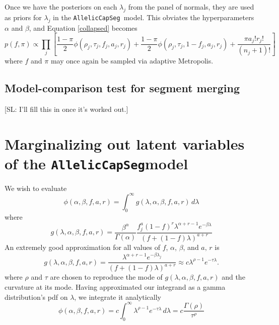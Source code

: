 \documentclass[nofootinbib,amssymb,amsmath]{revtex4}
\newcommand{\ACS}{\texttt{AllelicCapSeg}}
\def\SL#1{{\color [rgb]{0,0,0.8} [SL: #1]}}
\begin{document}
Once we have the posteriors on each $\lambda_j$ from the panel of normals, they are used as priors for $\lambda_j$ in the \ACS~model.  This obviates the hyperparameters $\alpha$ and $\beta$, and Equation \ref{collapsed} becomes
%
\begin{equation}
p(f, \pi) \propto \prod_j 
\left[    \frac{1-\pi}{2} \phi(\rho_j, \tau_j, f_j, a_j, r_j)  +
\frac{1-\pi}{2} \phi(\rho_j, \tau_j, 1 - f_j, a_j, r_j)  +
 \frac{ \pi a_j! r_j!}{(n_j + 1)!}    \right]
 \label{collapsed_using_pon}
\end{equation}
%
where $f$ and $\pi$ may once again be sampled via adaptive Metropolis.

\subsection{Model-comparison test for segment merging} \label{likelihood-based-segment-merging}

\SL{I'll fill this in once it's worked out.}

\appendix

\section{Marginalizing out latent variables of the \ACS model} \label{marginalizing}
We wish to evaluate
%
\begin{equation}
\phi(\alpha, \beta, f, a, r) = \int_0^\infty g(\lambda, \alpha, \beta, f, a, r) \, d \lambda 
\end{equation}
%
where
%
\begin{equation}
g(\lambda, \alpha, \beta, f, a, r) =  \frac{\beta^\alpha}{\Gamma(\alpha)}  \frac{ f_j^{a} (1 - f)^{r}  \lambda^{\alpha + r - 1} e^{-\beta \lambda}}{ \left( f + (1-f) \lambda \right)^{a+r}} 
\end{equation}
%
An extremely good approximation for all values of $f$, $\alpha$, $\beta$, and $a, \, r$ is
\begin{equation}
g(\lambda, \alpha, \beta, f, a, r) = \frac{\lambda^{\alpha + r - 1} e^{-\beta \lambda_j}}{ \left( f + (1-f) \lambda \right)^{a+r}} \approx c \lambda^{\rho - 1} e^{-\tau \lambda}.
\end{equation}
where $\rho$ and $\tau$ are chosen to reproduce the mode of $g(\lambda, \alpha, \beta, f, a, r)$ and the curvature at its mode.  Having approximated our integrand as a gamma distribution's pdf on $\lambda$, we integrate it analytically
%
\begin{equation}
\phi(\alpha, \beta, f, a, r) = c \int_0^\infty \lambda^{\rho - 1} e^{-\tau \lambda} \, d \lambda = c \frac{\Gamma(\rho)}{\tau^\rho}
\end{equation}
%
\end{document}
